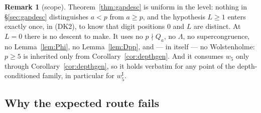 \documentclass[11pt,reqno]{amsart}
\theoremstyle{plain}
\theoremstyle{definition}
\newtheorem{remark}[theorem]{Remark}
\theoremstyle{remark}
\numberwithin{equation}{section}
\newcommand{\wfive}{w_5}
\begin{document}
\begin{remark}[scope]
Theorem~\ref{thm:gapdesc} is uniform in the level: nothing in \S\ref{sec:gapdesc} distinguishes
$a<p$ from $a\ge p$, and the hypothesis $L\ge1$ enters exactly once, in (DK2), to know that
digit positions $0$ and $L$ are distinct. At $L=0$ there is no descent to make. It uses no
$p\nmid Q_a$, no $\Lambda$, no supercongruence, no Lemma~\ref{lem:Phi}, no Lemma~\ref{lem:Dpp},
and --- in itself --- no Wolstenholme: $p\ge5$ is inherited only from
Corollary~\ref{cor:depthgen}. And it consumes $\wfive$ only through
Corollary~\ref{cor:depthgen}, so it holds verbatim for any point of the depth-conditioned
family, in particular for $w_5^{\mathrm I}$.
\end{remark}

\subsection{Why the expected route fails}\label{sec:trap}
\end{document}
